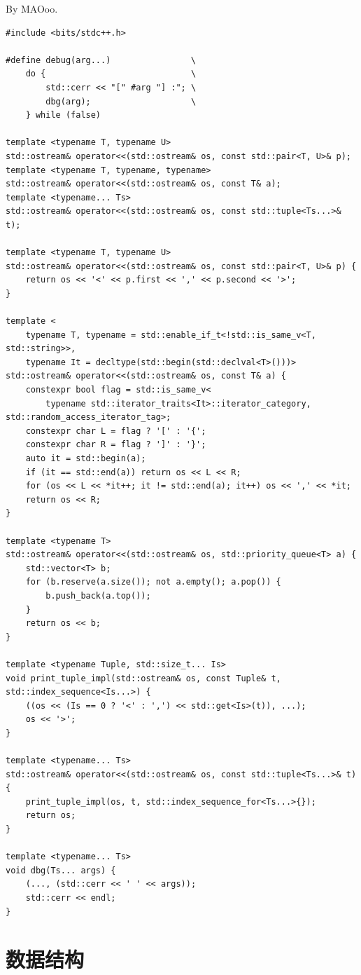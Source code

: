 \documentclass[UTF8, a4paper, titlepage, twoside]{ctexart}
\begin{document}
By MAOoo.
\begin{lstlisting}[style = cpp]
#include <bits/stdc++.h>

#define debug(arg...)                \
    do {                             \
        std::cerr << "[" #arg "] :"; \
        dbg(arg);                    \
    } while (false)

template <typename T, typename U>
std::ostream& operator<<(std::ostream& os, const std::pair<T, U>& p);
template <typename T, typename, typename>
std::ostream& operator<<(std::ostream& os, const T& a);
template <typename... Ts>
std::ostream& operator<<(std::ostream& os, const std::tuple<Ts...>& t);

template <typename T, typename U>
std::ostream& operator<<(std::ostream& os, const std::pair<T, U>& p) {
    return os << '<' << p.first << ',' << p.second << '>';
}

template <
    typename T, typename = std::enable_if_t<!std::is_same_v<T, std::string>>,
    typename It = decltype(std::begin(std::declval<T>()))>
std::ostream& operator<<(std::ostream& os, const T& a) {
    constexpr bool flag = std::is_same_v<
        typename std::iterator_traits<It>::iterator_category, std::random_access_iterator_tag>;
    constexpr char L = flag ? '[' : '{';
    constexpr char R = flag ? ']' : '}';
    auto it = std::begin(a);
    if (it == std::end(a)) return os << L << R;
    for (os << L << *it++; it != std::end(a); it++) os << ',' << *it;
    return os << R;
}

template <typename T>
std::ostream& operator<<(std::ostream& os, std::priority_queue<T> a) {
    std::vector<T> b;
    for (b.reserve(a.size()); not a.empty(); a.pop()) {
        b.push_back(a.top());
    }
    return os << b;
}

template <typename Tuple, std::size_t... Is>
void print_tuple_impl(std::ostream& os, const Tuple& t, std::index_sequence<Is...>) {
    ((os << (Is == 0 ? '<' : ',') << std::get<Is>(t)), ...);
    os << '>';
}

template <typename... Ts>
std::ostream& operator<<(std::ostream& os, const std::tuple<Ts...>& t) {
    print_tuple_impl(os, t, std::index_sequence_for<Ts...>{});
    return os;
}

template <typename... Ts>
void dbg(Ts... args) {
    (..., (std::cerr << ' ' << args));
    std::cerr << endl;
}
\end{lstlisting}

\newpage

\section{ 数据结构 }
\end{document}
